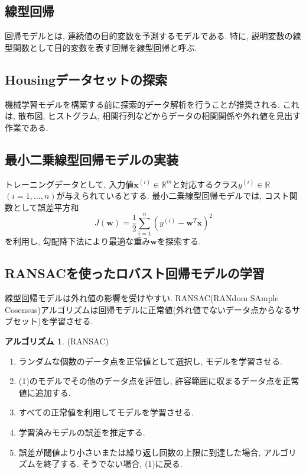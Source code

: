 \documentclass[uplatex]{jsarticle}
\theoremstyle{definition}
\newtheorem{algorithm}[definition]{アルゴリズム}
\numberwithin{equation}{section}
\newcommand{\R}{\mathbb{R}}
\begin{document}
\subsection{線型回帰}
回帰モデルとは, 連続値の目的変数を予測するモデルである.
特に, 説明変数の線型関数として目的変数を表す回帰を線型回帰と呼ぶ.

\subsection{Housingデータセットの探索}
機械学習モデルを構築する前に探索的データ解析を行うことが推奨される.
これは, 散布図, ヒストグラム, 相関行列などからデータの相関関係や外れ値を見出す作業である.

\subsection{最小二乗線型回帰モデルの実装}
トレーニングデータとして, 入力値$\bm{x}^{(i)} \in \R^{m}$と対応するクラス$y^{(i)} \in \R$ $(i = 1, \dots, n)$が与えられているとする.
最小二乗線型回帰モデルでは, コスト関数として誤差平方和
\begin{equation}
    J(\bm{w}) = \frac{1}{2}\sum_{i = 1}^{n} (y^{(i)} - \bm{w}^{T}\bm{x})^{2}
\end{equation}
を利用し, 勾配降下法により最適な重み$\bm{w}$を探索する.

\subsection{RANSACを使ったロバスト回帰モデルの学習}
線型回帰モデルは外れ値の影響を受けやすい.
RANSAC(RANdom SAmple Cosensus)アルゴリズムは回帰モデルに正常値(外れ値でないデータ点からなるサブセット)を学習させる.
\begin{algorithm}
    (RANSAC)
    \begin{enumerate}
        \item
        ランダムな個数のデータ点を正常値として選択し, モデルを学習させる.

        \item
        (1)のモデルでその他のデータ点を評価し, 許容範囲に収まるデータ点を正常値に追加する.

        \item
        すべての正常値を利用してモデルを学習させる.

        \item
        学習済みモデルの誤差を推定する.

        \item
        誤差が閾値より小さいまたは繰り返し回数の上限に到達した場合, アルゴリズムを終了する.
        そうでない場合, (1)に戻る.
    \end{enumerate}
\end{algorithm}
\end{document}
